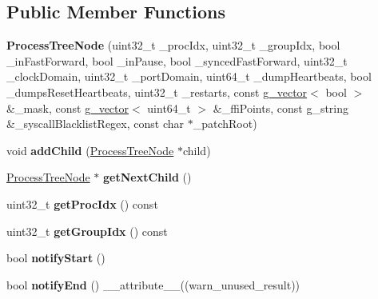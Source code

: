 \subsection*{Public Member Functions}
\begin{DoxyCompactItemize}
\item 
\hypertarget{classProcessTreeNode_af0e182f32f66ca90d7db83c6a51df5bb}{{\bfseries Process\-Tree\-Node} (uint32\-\_\-t \-\_\-proc\-Idx, uint32\-\_\-t \-\_\-group\-Idx, bool \-\_\-in\-Fast\-Forward, bool \-\_\-in\-Pause, bool \-\_\-synced\-Fast\-Forward, uint32\-\_\-t \-\_\-clock\-Domain, uint32\-\_\-t \-\_\-port\-Domain, uint64\-\_\-t \-\_\-dump\-Heartbeats, bool \-\_\-dumps\-Reset\-Heartbeats, uint32\-\_\-t \-\_\-restarts, const \hyperlink{classg__vector}{g\-\_\-vector}$<$ bool $>$ \&\-\_\-mask, const \hyperlink{classg__vector}{g\-\_\-vector}$<$ uint64\-\_\-t $>$ \&\-\_\-ffi\-Points, const g\-\_\-string \&\-\_\-syscall\-Blacklist\-Regex, const char $\ast$\-\_\-patch\-Root)}\label{classProcessTreeNode_af0e182f32f66ca90d7db83c6a51df5bb}

\item 
\hypertarget{classProcessTreeNode_a9d6d52ef8c9bc5222b434db0dc7e5b30}{void {\bfseries add\-Child} (\hyperlink{classProcessTreeNode}{Process\-Tree\-Node} $\ast$child)}\label{classProcessTreeNode_a9d6d52ef8c9bc5222b434db0dc7e5b30}

\item 
\hypertarget{classProcessTreeNode_a7adddbecca58d0bdf6937e6019e47447}{\hyperlink{classProcessTreeNode}{Process\-Tree\-Node} $\ast$ {\bfseries get\-Next\-Child} ()}\label{classProcessTreeNode_a7adddbecca58d0bdf6937e6019e47447}

\item 
\hypertarget{classProcessTreeNode_aba159f52890875d4869f002c3748a8db}{uint32\-\_\-t {\bfseries get\-Proc\-Idx} () const }\label{classProcessTreeNode_aba159f52890875d4869f002c3748a8db}

\item 
\hypertarget{classProcessTreeNode_a2b7ca370831a0b647b52e8ef908e08ae}{uint32\-\_\-t {\bfseries get\-Group\-Idx} () const }\label{classProcessTreeNode_a2b7ca370831a0b647b52e8ef908e08ae}

\item 
\hypertarget{classProcessTreeNode_af42f3f697cb40a638e11ec922206a69e}{bool {\bfseries notify\-Start} ()}\label{classProcessTreeNode_af42f3f697cb40a638e11ec922206a69e}

\item 
\hypertarget{classProcessTreeNode_a6e9072197aed03980e448dbc5f851774}{bool {\bfseries notify\-End} () \-\_\-\-\_\-attribute\-\_\-\-\_\-((warn\-\_\-unused\-\_\-result))}\label{classProcessTreeNode_a6e9072197aed03980e448dbc5f851774}


\end{DoxyCompactItemize}
